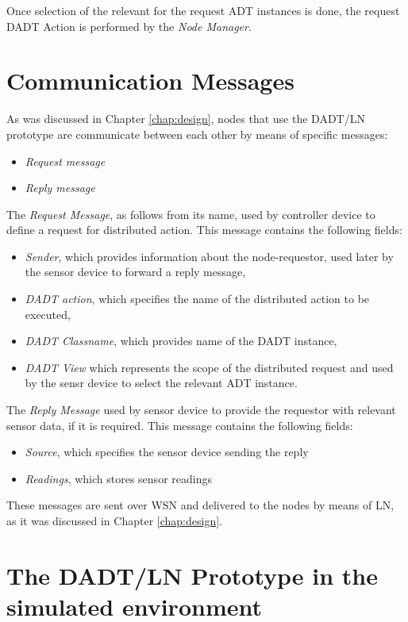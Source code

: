 Once selection of the relevant for the request ADT instances is done, the
request DADT Action is performed by the \emph{Node Manager}.

\section{Communication Messages} \label{sec:messages}

As was discussed in Chapter \ref{chap:design}, nodes that use the DADT/LN
prototype are communicate between each other by means of specific messages:
\begin{itemize}
  \item \emph{Request message}
  \item \emph{Reply message}
\end{itemize} 

The \emph{Request Message}, as follows from its name, used by controller device
to define a request for distributed action. This message contains 
the following fields: 
\begin{itemize}
  \item \emph{Sender}, which provides information about the node-requestor,
  used later by the sensor device to forward a reply message,
  \item \emph{DADT action}, which specifies the name of the distributed
  action to be executed,
  \item \emph{DADT Classname}, which provides name of the DADT instance,
  \item \emph{DADT View} which represents the scope of the distributed request
  and used by the sensr device to select the relevant  ADT instance.
\end{itemize}

The \emph{Reply Message} used by sensor device to provide the requestor with
relevant sensor data, if it is required. This message contains the following
fields:
\begin{itemize}
  \item \emph{Source}, which specifies the sensor device sending the reply
  \item \emph{Readings}, which stores sensor readings  
\end{itemize}

These messages are sent over WSN and delivered to the nodes by means of LN, as it was discussed in Chapter \ref{chap:design}.

\section{The DADT/LN Prototype in the simulated environment}

